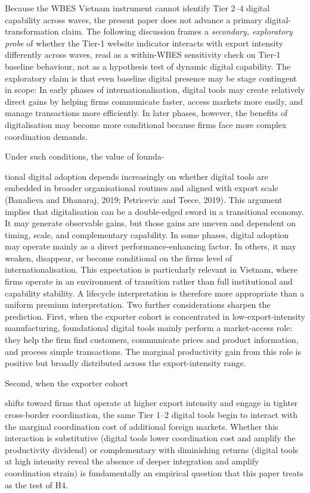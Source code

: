 \documentclass[12pt,a4paper]{article}
\begin{document}
Because the WBES Vietnam instrument cannot identify Tier 2--4 digital
capability across waves, the present paper does not advance a primary
digital-transformation claim. The following discussion frames a
\emph{secondary, exploratory probe} of whether the Tier-1 website
indicator interacts with export intensity differently across waves, read
as a within-WBES sensitivity check on Tier-1 baseline behaviour, not as
a hypothesis test of dynamic digital capability. The exploratory claim
is that even baseline digital presence may be stage contingent in scope:
In early phases of internationalisation, digital tools may create
relatively direct gains by helping firms communicate faster, access
markets more easily, and manage transactions more efficiently. In later
phases, however, the benefits of digitalisation may become more
conditional because firms face more complex coordination demands.

Under such conditions, the value of founda-

tional digital adoption depends increasingly on whether digital tools
are embedded in broader organisational routines and aligned with export
scale (Banalieva and Dhanaraj, 2019; Petricevic and Teece, 2019). This
argument implies that digitalisation can be a double-edged sword in a
transitional economy. It may generate observable gains, but those gains
are uneven and dependent on timing, scale, and complementary capability.
In some phases, digital adoption may operate mainly as a direct
performance-enhancing factor. In others, it may weaken, disappear, or
become conditional on the firm\textquotesingle s level of
internationalisation. This expectation is particularly relevant in
Vietnam, where firms operate in an environment of transition rather than
full institutional and capability stability. A lifecycle interpretation
is therefore more appropriate than a uniform premium interpretation. Two
further considerations sharpen the prediction. First, when the exporter
cohort is concentrated in low-export-intensity manufacturing,
foundational digital tools mainly perform a market-access role: they
help the firm find customers, communicate prices and product
information, and process simple transactions. The marginal productivity
gain from this role is positive but broadly distributed across the
export-intensity range.

Second, when the exporter cohort

shifts toward firms that operate at higher export intensity and engage
in tighter cross-border coordination, the same Tier 1--2 digital tools
begin to interact with the marginal coordination cost of additional
foreign markets. Whether this interaction is substitutive (digital tools
lower coordination cost and amplify the productivity dividend) or
complementary with diminishing returns (digital tools at high intensity
reveal the absence of deeper integration and amplify coordination
strain) is fundamentally an empirical question that this paper treats as
the test of H4.
\end{document}
